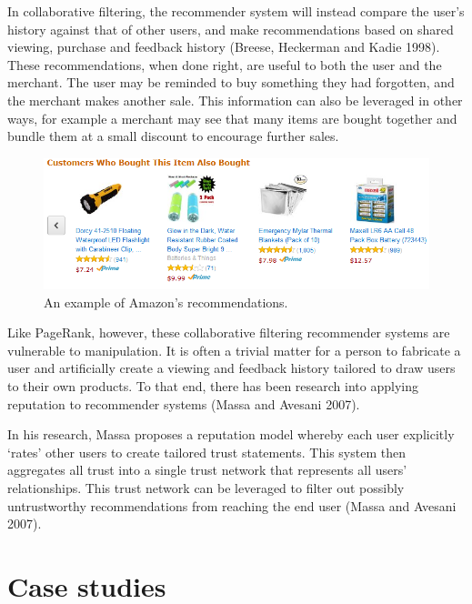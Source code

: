 \documentclass[]{final_report}
\begin{document}
In collaborative filtering, the recommender system will instead compare the user's history against that of other users, and make recommendations based on shared viewing, purchase and feedback history (Breese, Heckerman and Kadie 1998). These recommendations, when done right, are useful to both the user and the merchant. The user may be reminded to buy something they had forgotten, and the merchant makes another sale. This information can also be leveraged in other ways, for example a merchant may see that many items are bought together and bundle them at a small discount to encourage further sales.

\begin{figure}[ht!]
\centering
\includegraphics[width=120mm]{recommender.png}
\caption{An example of Amazon's recommendations.}
\end{figure}

Like PageRank, however, these collaborative filtering recommender systems are vulnerable to manipulation. It is often a trivial matter for a person to fabricate a user and artificially create a viewing and feedback history tailored to draw users to their own products. To that end, there has been research into applying reputation to recommender systems (Massa and Avesani 2007).

In his research, Massa proposes a reputation model whereby each user explicitly `rates' other users to create tailored trust statements. This system then aggregates all trust into a single trust network that represents all users' relationships. This trust network can be leveraged to filter out possibly untrustworthy recommendations from reaching the end user (Massa and Avesani 2007).

\section{Case studies}
\end{document}
